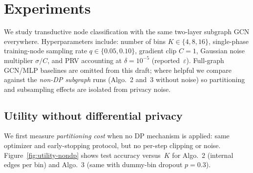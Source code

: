 %
%
%
%

\section{Experiments}
\label{sec:experiments}

We study transductive node classification with the same two-layer subgraph GCN everywhere.
Hyperparameters include: number of bins $K \in \{4,8,16\}$, single-phase training-node sampling rate $q \in \{0.05,0.10\}$, gradient clip $C{=}1$, Gaussian noise multiplier $\sigma/C$, and PRV accounting at $\delta{=}10^{-5}$ (reported~$\varepsilon$).
Full-graph GCN/MLP baselines are omitted from this draft; where helpful we compare against the \emph{non-DP subgraph} runs (Algo.~2 and~3 without noise) so partitioning and subsampling effects are isolated from privacy noise.

\subsection{Utility without differential privacy}
\label{sec:exp-nondp}

We first measure \emph{partitioning cost} when no DP mechanism is applied: same optimizer and early-stopping protocol, but no per-step clipping or noise.
Figure~\ref{fig:utility-nondp} shows test accuracy versus~$K$ for Algo.~2 (internal edges per bin) and Algo.~3 (same with dummy-bin dropout $p{=}0.3$).

